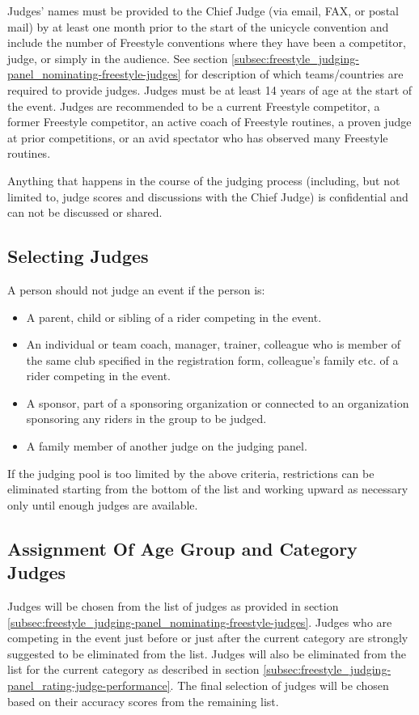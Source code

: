 Judges' names must be provided to the Chief Judge (via email, FAX, or postal mail) by at least one month prior to the start of the unicycle convention and include the number of Freestyle conventions where they have been a competitor, judge, or simply in the audience.%
See section \ref{subsec:freestyle_judging-panel_nominating-freestyle-judges} for description of which teams/countries are required to provide judges.
Judges must be at least 14 years of age at the start of the event.
Judges are recommended to be a current Freestyle competitor, a former Freestyle competitor, an active coach of Freestyle routines, a proven judge at prior competitions, or an avid spectator who has observed many Freestyle routines.

Anything that happens in the course of the judging process (including, but not limited to, judge scores and discussions with the Chief Judge) is confidential and can not be discussed or shared.

\subsection{Selecting Judges \label{subsec:freestyle_judging-panel_selecting-judges}}
A person should not judge an event if the person is:
\begin{itemize}
\item A parent, child or sibling of a rider competing in the event.
\item An individual or team coach, manager, trainer, colleague who is member of the same club specified in the registration form, colleague's family etc.
of a rider competing in the event.
\item A sponsor, part of a sponsoring organization or connected to an organization sponsoring any riders in the group to be judged.
\item A family member of another judge on the judging panel.
\end{itemize}
If the judging pool is too limited by the above criteria, restrictions can be eliminated starting from the bottom of the list and working upward as necessary only until enough judges are available.

\subsection{Assignment Of Age Group and Category Judges}
Judges will be chosen from the list of judges as provided in section \ref{subsec:freestyle_judging-panel_nominating-freestyle-judges}.
Judges who are competing in the event just before or just after the current category are strongly suggested to be eliminated from the list.
Judges will also be eliminated from the list for the current category as described in section \ref{subsec:freestyle_judging-panel_rating-judge-performance}.
The final selection of judges will be chosen based on their accuracy scores from the remaining list.%

